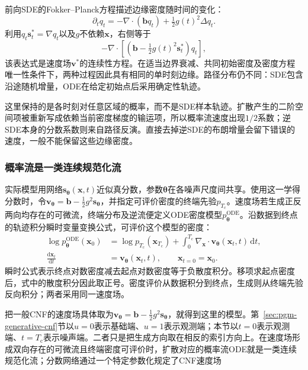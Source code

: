 前向SDE的Fokker--Planck方程描述边缘密度随时间的变化：
\[
  \partial_t q_t
    =-\nabla\cdot(\bm{b}q_t)+\tfrac12g(t)^2\Delta q_t.
\]
利用$q_t\bm{s}_t^*=\nabla q_t$以及$g$不依赖$\bm{x}$，右侧等于
\[
  -\nabla\cdot
       \left[\left(\bm{b}-\tfrac12g(t)^2\bm{s}_t^*\right)q_t\right],
\]
该表达式是速度场$\bm{v}^*$的连续性方程。在适当边界衰减、共同初始密度及密度方程唯一性条件下，两种过程因此具有相同的单时刻边缘。路径分布仍不同：SDE包含沿途随机增量，ODE在给定初始点后采用确定性轨迹。

这里保持的是各时刻对任意区域的概率，而不是SDE样本轨迹。扩散产生的二阶空间项被重新写成依赖当前密度梯度的输运项，所以概率流速度出现$1/2$系数；逆SDE本身的分数系数则来自路径反演。直接去掉逆SDE的布朗增量会留下错误的速度，一般不能保留这些边缘密度。

\subsubsection{概率流是一类连续规范化流}
\label{sec:pgm-generative-probability-flow-cnf}

实际模型用网络$\bm s_{\bm\theta}(\bm x,t)$近似真分数，参数$\bm\theta$在各噪声尺度间共享。使用这一学得分数时，令$\bm{v}_{\bm{\theta}}=\bm{b}-\tfrac12g^2\bm{s}_{\bm{\theta}}$，并指定可评价密度的终端先验$p_{T_{\mathrm{c}}}$。速度场若生成正反两向均存在的可微流，终端分布及逆流便定义ODE密度模型$p_{\bm{\theta}}^{\mathrm{ODE}}$。沿数据到终点的轨迹积分瞬时变量变换公式，可评价这个模型的密度：
\begin{equation}
  \label{eq:pgm-generative-ode-likelihood}
  \begin{aligned}
    \log p_{\bm{\theta}}^{\mathrm{ODE}}(\bm{x}_0)
       &=\log p_{T_{\mathrm{c}}}(\bm{x}_{T_{\mathrm{c}}})
          +\int_0^{T_{\mathrm{c}}}
            \nabla_{\bm{x}}\cdot
            \bm{v}_{\bm{\theta}}(\bm{x}_t,t)\,\mathrm{d}t,\\
    \frac{\mathrm{d}\bm{x}_t}{\mathrm{d}t}
       &=\bm{v}_{\bm{\theta}}(\bm{x}_t,t),
       \qquad \bm{x}_{t=0}=\bm{x}_0.
  \end{aligned}
\end{equation}
瞬时公式表示终点对数密度减去起点对数密度等于负散度积分。移项求起点密度后，式中的散度积分因此取正号。密度评价从数据积分到终点，生成则从终端先验反向积分；两者采用同一速度场。

把一般CNF的速度场具体取为$\bm v_{\bm\theta}=\bm b-\tfrac12g^2\bm s_{\bm\theta}$，就得到这里的模型。第~\ref{sec:pgm-generative-cnf}节以$u=0$表示基础端、$u=1$表示观测端；本节以$t=0$表示观测端、$t=T_{\mathrm c}$表示噪声端。二者只是把生成方向取在相反的索引方向上。在速度场形成双向存在的可微流且终端密度可评价时，扩散对应的概率流ODE就是一类连续规范化流；分数网络通过一个特定参数化规定了CNF速度场


